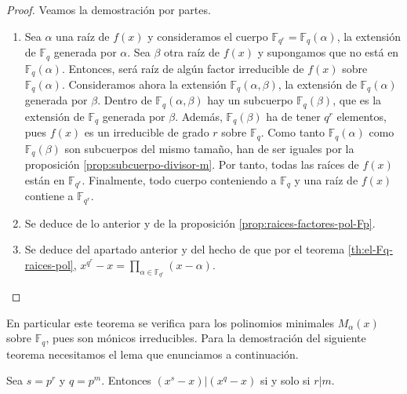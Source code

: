 \begin{proof}
  Veamos la demostración por partes.
  \begin{enumerate}
    \item Sea \(\alpha\) una raíz de \(f(x)\) y consideramos el cuerpo \(\mathbb F_{q^r} = \mathbb F_{q}(\alpha)\), la extensión de \(\mathbb F_q\) generada por \(\alpha\).
    Sea \(\beta\) otra raíz de \(f(x)\) y supongamos que no está en \(\mathbb F_{q}(\alpha)\).
    Entonces, será raíz de algún factor irreducible de \(f(x)\) sobre \(\mathbb F_{q}(\alpha)\).
    Consideramos ahora la extensión \(\mathbb F_{q}(\alpha, \beta)\), la extensión de \(\mathbb F_{q}(\alpha)\) generada por \(\beta\).
    Dentro de \(\mathbb F_{q}(\alpha, \beta)\) hay un subcuerpo \(\mathbb F_{q}(\beta)\), que es la extensión de \(\mathbb F_q\) generada por \(\beta\).
    Además, \(\mathbb F_{q}(\beta)\) ha de tener \(q^r\) elementos, pues \(f(x)\) es un irreducible de grado \(r\) sobre \(\mathbb F_q\).
    Como tanto \(\mathbb F_{q}(\alpha)\) como \(\mathbb F_{q}(\beta)\) son subcuerpos del mismo tamaño, han de ser iguales por la proposición \ref{prop:subcuerpo-divisor-m}.
    Por tanto, todas las raíces de \(f(x)\) están en \(\mathbb F_{q^r}\).
    Finalmente, todo cuerpo conteniendo a \(\mathbb F_q\) y una raíz de \(f(x)\) contiene a \(\mathbb F_{q^r}\).
    \item Se deduce de lo anterior y de la proposición \ref{prop:raices-factores-pol-Fp}.
    \item Se deduce del apartado anterior y del hecho de que por el teorema \ref{th:el-Fq-raices-pol}, \(x^{q^r} - x = \prod_{\alpha \in \mathbb F_{q^r}}(x - \alpha)\).\qedhere
  \end{enumerate}
\end{proof}

En particular este teorema se verifica para los polinomios minimales \(M_{\alpha}(x)\) sobre \(\mathbb F_q\), pues son mónicos irreducibles.
Para la demostración del siguiente teorema necesitamos el lema que enunciamos a continuación.

\begin{lemma}
  \label{lem:pol-s-q-div}
  Sea \(s = p^r\) y \(q = p^m\).
  Entonces \((x^s - x) | (x^q - x)\) si y solo si \(r | m\).
\end{lemma}

